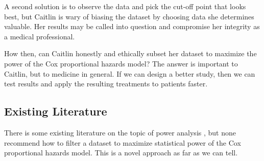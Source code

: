 A second solution is to observe the data and pick the cut-off point that looks best, but Caitlin is wary of biasing the dataset by choosing data she determines valuable. Her results may be called into question and compromise her integrity as a medical professional. 

How then, can Caitlin honestly and ethically subset her dataset to maximize the power of the Cox proportional hazards model? The answer is important to Caitlin, but to medicine in general. If we can design a better study, then we can test results and apply the resulting treatments to patients faster. 

\subsection{Existing Literature}

There is some existing literature on the topic of power analysis \cite{bender, gonen, hsieh}, but none recommend how to filter a dataset to maximize statistical power of the Cox proportional hazards model. This is a novel approach as far as we can tell.



